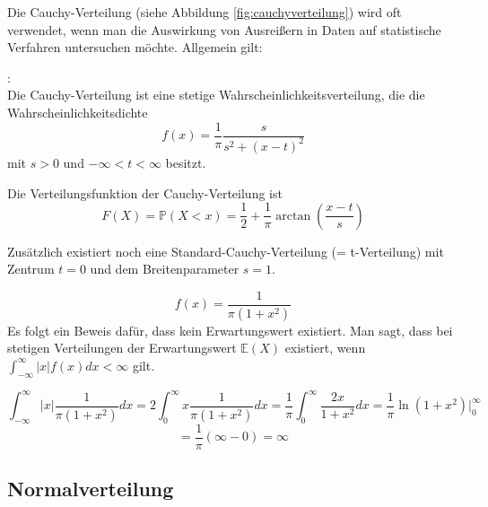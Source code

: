 {    Die Cauchy-Verteilung (siehe Abbildung \ref{fig:cauchyverteilung}) wird oft verwendet, wenn man die Auswirkung von
    Ausreißern in Daten auf statistische Verfahren untersuchen möchte.
    Allgemein gilt:

    \begin{definition}:\\
    Die Cauchy-Verteilung ist eine stetige Wahrscheinlichkeitsverteilung,
    die die Wahrscheinlichkeitsdichte
    \[
    f\left(x\right)=\frac{1}{\pi }\frac{s}{s^{2}+\left(x-t\right)^{2}}
    \]
    mit $s>0$ und $-{\infty}<t<{\infty}$ besitzt.

    Die Verteilungsfunktion der Cauchy-Verteilung ist 
    \[
    F\left(X\right)=\mathbb P\left(X<x\right)=\frac{1}{2}+\frac{1}{\pi
    }\arctan\left(\frac{x-t}{s}\right)
    \]
    \end{definition}


    Zusätzlich existiert noch eine Standard-Cauchy-Verteilung (=
    t-Verteilung) mit Zentrum $t=0$ und dem Breitenparameter $s=1$. 

    \[
    f\left(x\right)=\frac{1}{\pi (1+x^{2})}
    \]
    Es folgt ein Beweis dafür, dass kein
    Erwartungswert existiert. Man sagt, dass bei stetigen Verteilungen der
    Erwartungswert
    $\mathbb E\left(X\right)$ existiert, wenn $\int
    _{-{\infty}}^{{\infty}}{|x|f(x)}dx<{\infty}$ gilt.

    \[
    \int_{-{\infty}}^{{\infty}}{|x|\frac{1}{\pi\left(1+x^{2}\right)}}dx
    =2\int _{0}^{{\infty}}{x\frac{1}{\pi(1+x^{2})}}dx
    =\frac{1}{\pi }\int_{0}^{{\infty}}\frac{{2x}}{1+x^{2}}dx
    =\frac{1}{\pi }\ln\left(1+x^{2}\right)|_{0}^{{\infty}}
    \]
    \[
    =\frac{1}{\pi}\left({\infty}-0\right)={\infty}
    \]

    
    \subsection{Normalverteilung}
    \label{sec:normalverteilung}

}
